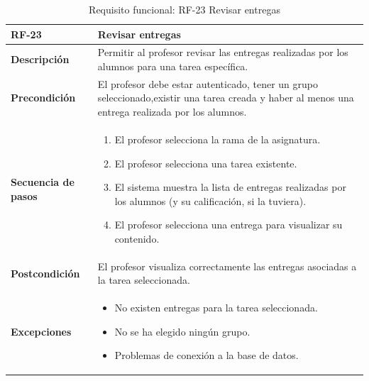 \begin{table}[H]
\centering
\begin{tabularx}{\textwidth}{
  |>{\centering\arraybackslash}l
  |>{\centering\arraybackslash}X|}
\hline
\textbf{RF-23} & \textbf{Revisar entregas} \\ \hline

\textbf{Descripción} & Permitir al profesor revisar las entregas realizadas por los alumnos para una tarea específica. \\ \hline

\textbf{Precondición} & El profesor debe estar autenticado, tener un grupo seleccionado,existir una tarea creada y haber al menos una entrega realizada por los alumnos. \\ \hline

\textbf{Secuencia de pasos} &
\begin{enumerate}
  \item El profesor selecciona la rama de la asignatura.
  \item El profesor selecciona una tarea existente.
  \item El sistema muestra la lista de entregas realizadas por los alumnos (y su calificación, si la tuviera).
  \item El profesor selecciona una entrega para visualizar su contenido.
\end{enumerate} \\ \hline

\textbf{Postcondición} & El profesor visualiza correctamente las entregas asociadas a la tarea seleccionada. \\ \hline

\textbf{Excepciones} &
\begin{itemize}
  \item No existen entregas para la tarea seleccionada.
  \item No se ha elegido ningún grupo.
  \item Problemas de conexión a la base de datos.
\end{itemize} \\ \hline
\end{tabularx}
\caption{Requisito funcional: RF-23 Revisar entregas}
\label{tab:RF-23}
\end{table}


